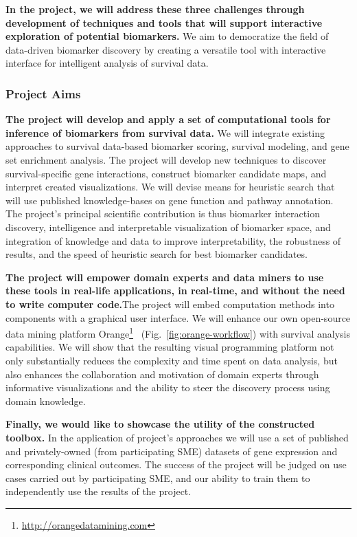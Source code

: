 \documentclass[11pt,a4paper]{article}
\newcommand{\myurl}[1]{\footnote{\url{#1}}}
\renewcommand{\bold}{\textbf}
\begin{document}
\bold{In the project, we will address these three challenges through development of techniques and tools that will support interactive exploration of potential biomarkers.} We aim to democratize the field of data-driven biomarker discovery by creating a versatile tool with interactive interface for intelligent analysis of survival data.

\subsubsection*{Project Aims}

\bold{The project will develop and apply a set of computational tools for inference of biomarkers from survival data.} We will integrate existing approaches to survival data-based biomarker scoring, survival modeling, and gene set enrichment analysis. The project will develop new techniques to discover survival-specific gene interactions, construct biomarker candidate maps, and interpret created visualizations. We will devise means for heuristic search that will use published knowledge-bases on gene function and pathway annotation. The project's principal scientific contribution is thus biomarker interaction discovery, intelligence and interpretable visualization of biomarker space, and integration of knowledge and data to improve interpretability, the robustness of results, and the speed of heuristic search for best biomarker candidates.

\bold{The project will empower domain experts and data miners to use these tools in real-life applications, in real-time, and without the need to write computer code.}The project will embed computation methods into components with a graphical user interface. We will enhance our own open-source data mining platform Orange\myurl{http://orangedatamining.com}~\cite{Demsar2013,Curk2005,Godec2019} (Fig.~\ref{fig:orange-workflow}) with survival analysis capabilities. We will show that the resulting visual programming platform not only substantially reduces the complexity and time spent on data analysis, but also enhances the collaboration and motivation of domain experts through informative visualizations and the ability to steer the discovery process using domain knowledge.

\bold{Finally, we would like to showcase the utility of the constructed toolbox.} In the application of project's approaches we will use a set of published and privately-owned (from participating SME) datasets of gene expression and corresponding clinical outcomes. The success of the project will be judged on use cases carried out by participating SME, and our ability to train them to independently use the results of the project.
\end{document}
